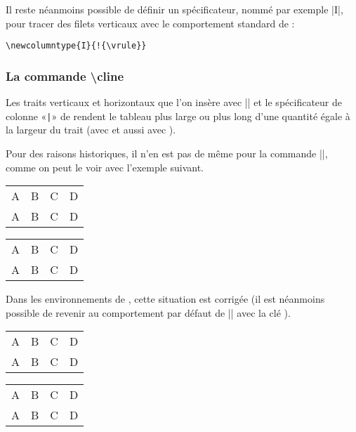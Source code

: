 \documentclass[dvipsnames]{article}%
\begin{document}
\medskip
Il reste néanmoins possible de définir un spécificateur, nommé par exemple
|I|, pour tracer des filets verticaux avec le comportement standard de
 :
%
\begin{Verbatim}
\newcolumntype{I}{!{\vrule}}
\end{Verbatim}




\subsubsection{La commande  \textbackslash cline}

\label{remark-cline}

Les traits verticaux et horizontaux que l'on insère avec |\hline| et le
spécificateur de colonne «\verb+|+» de  rendent le tableau plus large
ou plus long d'une quantité égale à la largeur du trait (avec  et
aussi avec ).

\smallskip
Pour des raisons historiques, il n'en est pas de même pour la commande |\cline|,
comme on peut le voir avec l'exemple suivant.

\medskip
\begin{Code}[width=10cm]
\setlength{\arrayrulewidth}{2pt}
\begin{tabular}{cccc} \hline
A&B&C&D \\ \emph{\cline{2-2}}
A&B&C&D \\ \hline
\end{tabular}
\end{Code}
%
\begin{scope}
\setlength{\arrayrulewidth}{2pt}
\begin{tabular}[c]{cccc}
\hline
A&B&C&D \\
\cline{2-2}
A&B&C&D \\
\hline
\end{tabular}
\end{scope}

\medskip
{}
Dans les environnements de , cette situation est corrigée (il
est néanmoins possible de revenir au comportement par défaut de |\cline| avec la
clé ).

\medskip
\begin{Code}[width=10cm]
\setlength{\arrayrulewidth}{2pt}
\begin{NiceTabular}{cccc} \hline
A&B&C&D \\ \emph{}
A&B&C&D \\ \hline
\end{NiceTabular}
\end{Code}
%
\begin{scope}
\setlength{\arrayrulewidth}{2pt}
\begin{NiceTabular}[c]{cccc}
\hline
A&B&C&D \\
A&B&C&D \\
\hline
\end{NiceTabular}
\end{scope}
\end{document}
